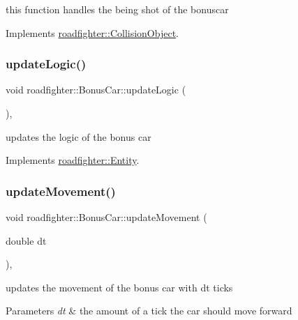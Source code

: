 this function handles the being shot of the bonuscar 

Implements \hyperlink{classroadfighter_1_1CollisionObject_a338a1071e6d5e25439e57c8673308dbb}{roadfighter\+::\+Collision\+Object}.

\mbox{\label{classroadfighter_1_1BonusCar_a21d55ad1e1595ac6c86ca20f8819778b}} 
\subsubsection{\texorpdfstring{update\+Logic()}{updateLogic()}}
{\footnotesize\ttfamily void roadfighter\+::\+Bonus\+Car\+::update\+Logic (\begin{DoxyParamCaption}{ }\end{DoxyParamCaption})\hspace{0.3cm}{\ttfamily [override]}, {\ttfamily [virtual]}}

updates the logic of the bonus car 

Implements \hyperlink{classroadfighter_1_1Entity_a54c00f1af306290bae3e4b84e196566b}{roadfighter\+::\+Entity}.

\mbox{\label{classroadfighter_1_1BonusCar_a2d3d584ca34a5df3b3c833123a9bbc30}} 
\subsubsection{\texorpdfstring{update\+Movement()}{updateMovement()}}
{\footnotesize\ttfamily void roadfighter\+::\+Bonus\+Car\+::update\+Movement (\begin{DoxyParamCaption}\item[{double}]{dt }\end{DoxyParamCaption})\hspace{0.3cm}{\ttfamily [override]}, {\ttfamily [virtual]}}

updates the movement of the bonus car with dt ticks 
\begin{DoxyParams}{Parameters}
{\em dt} & the amount of a tick the car should move forward \\
\hline
\end{DoxyParams}


